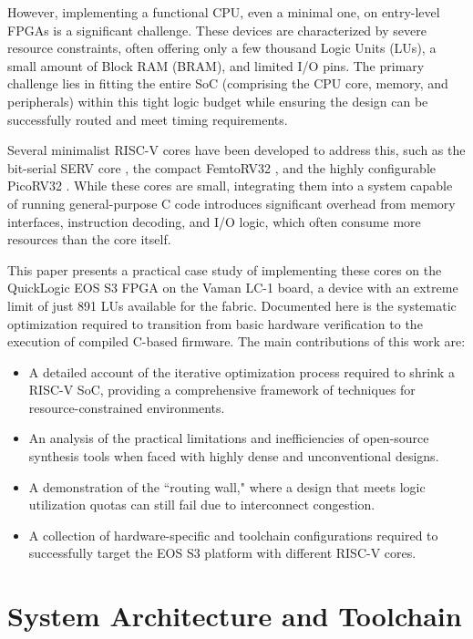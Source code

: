 \documentclass[conference]{IEEEtran}
\begin{document}
However, implementing a functional CPU, even a minimal one, on entry-level FPGAs is a significant challenge. These devices are characterized by severe resource constraints, often offering only a few thousand Logic Units (LUs), a small amount of Block RAM (BRAM), and limited I/O pins. The primary challenge lies in fitting the entire SoC (comprising the CPU core, memory, and peripherals) within this tight logic budget while ensuring the design can be successfully routed and meet timing requirements.

Several minimalist RISC-V cores have been developed to address this, such as the bit-serial SERV core \cite{serv_core}, the compact FemtoRV32 \cite{femtorv32_github}, and the highly configurable PicoRV32 \cite{picorv32_github}. While these cores are small, integrating them into a system capable of running general-purpose C code introduces significant overhead from memory interfaces, instruction decoding, and I/O logic, which often consume more resources than the core itself.

This paper presents a practical case study of implementing these cores on the QuickLogic EOS S3 FPGA on the Vaman LC-1 board, a device with an extreme limit of just 891 LUs available for the fabric. Documented here is the systematic optimization required to transition from basic hardware verification to the execution of compiled C-based firmware. The main contributions of this work are:
\begin{itemize}
    \item A detailed account of the iterative optimization process required to shrink a RISC-V SoC, providing a comprehensive framework of techniques for resource-constrained environments.
    \item An analysis of the practical limitations and inefficiencies of open-source synthesis tools when faced with highly dense and unconventional designs.
    \item A demonstration of the ``routing wall," where a design that meets logic utilization quotas can still fail due to interconnect congestion.
    \item A collection of hardware-specific and toolchain configurations required to successfully target the EOS S3 platform with different RISC-V cores.
\end{itemize}

\section{System Architecture and Toolchain}
\end{document}
